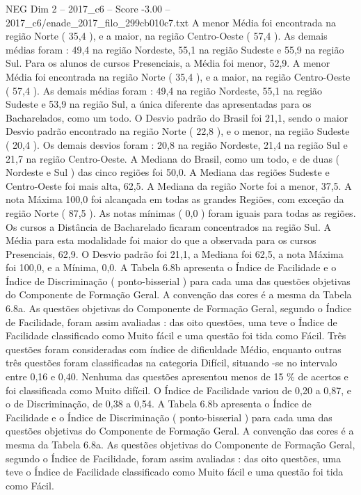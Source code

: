 \begin{textsample}{NEG Dim 2 – 2017\_c6 – Score -3.00 – 2017\_c6/enade\_2017\_filo\_299cb010c7.txt}
A menor Média foi encontrada na região Norte ( 35,4 ), e a maior, na região Centro-Oeste ( 57,4 ).
As demais médias foram : 49,4 na região Nordeste, 55,1 na região Sudeste e 55,9 na região Sul.
Para os alunos de cursos Presenciais, a Média foi menor, 52,9.
A menor Média foi encontrada na região Norte ( 35,4 ), e a maior, na região Centro-Oeste ( 57,4 ).
As demais médias foram : 49,4 na região Nordeste, 55,1 na região Sudeste e 53,9 na região Sul, a única diferente das apresentadas para os Bacharelados, como um todo.
O Desvio padrão do Brasil foi 21,1, sendo o maior Desvio padrão encontrado na região Norte ( 22,8 ), e o menor, na região Sudeste ( 20,4 ).
Os demais desvios foram : 20,8 na região Nordeste, 21,4 na região Sul e 21,7 na região Centro-Oeste.
A Mediana do Brasil, como um todo, e de duas ( Nordeste e Sul ) das cinco regiões foi 50,0.
A Mediana das regiões Sudeste e Centro-Oeste foi mais alta, 62,5.
A Mediana da região Norte foi a menor, 37,5.
A nota Máxima 100,0 foi alcançada em todas as grandes Regiões, com exceção da região Norte ( 87,5 ).
As notas mínimas ( 0,0 ) foram iguais para todas as regiões.
Os cursos a Distância de Bacharelado ficaram concentrados na região Sul.
A Média para esta modalidade foi maior do que a observada para os cursos Presenciais, 62,9.
O Desvio padrão foi 21,1, a Mediana foi 62,5, a nota Máxima foi 100,0, e a Mínima, 0,0.
A Tabela 6.8b apresenta o Índice de Facilidade e o Índice de Discriminação ( ponto-bisserial ) para cada uma das questões objetivas do Componente de Formação Geral.
A convenção das cores é a mesma da Tabela 6.8a.
As questões objetivas do Componente de Formação Geral, segundo o Índice de Facilidade, foram assim avaliadas : das oito questões, uma teve o Índice de Facilidade classificado como Muito fácil e uma questão foi tida como Fácil.
Três questões foram consideradas com índice de dificuldade Médio, enquanto outras três questões foram classificadas na categoria Difícil, situando -se no intervalo entre 0,16 e 0,40.
Nenhuma das questões apresentou menos de 15 \% de acertos e foi classificada como Muito difícil.
O Índice de Facilidade variou de 0,20 a 0,87, e o de Discriminação, de 0,38 a 0,54.
A Tabela 6.8b apresenta o Índice de Facilidade e o Índice de Discriminação ( ponto-bisserial ) para cada uma das questões objetivas do Componente de Formação Geral.
A convenção das cores é a mesma da Tabela 6.8a.
As questões objetivas do Componente de Formação Geral, segundo o Índice de Facilidade, foram assim avaliadas : das oito questões, uma teve o Índice de Facilidade classificado como Muito fácil e uma questão foi tida como Fácil.

\end{textsample}

